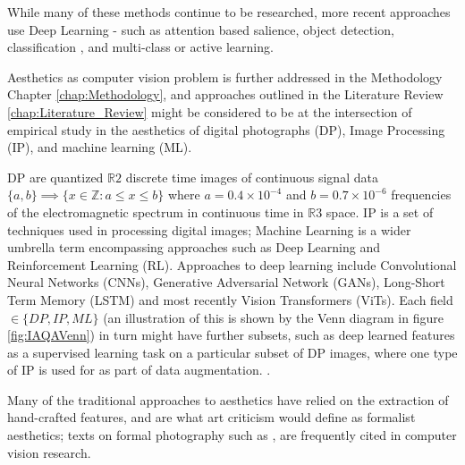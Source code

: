 \par While many of these methods continue to be researched, more recent approaches use Deep Learning - such as attention based salience\cite{Zhu2020}, object detection\cite {Mutch2006, Lei2019, Peng2018}, classification \cite{Jia2020}, and multi-class or active learning\cite{Wu2020a, Joshi2010, Li2004, Gu2015}.

Aesthetics as computer vision problem is further addressed in the Methodology Chapter \ref{chap:Methodology}, and approaches outlined in the Literature Review \ref{chap:Literature_Review} might be considered to be at the intersection of empirical study in the aesthetics of digital photographs (DP), Image Processing (IP), and machine learning (ML). 

\par DP are quantized $\mathbb{R}2$ discrete time images of continuous signal data $\{a,b\} \implies \{x\in \mathbb{Z} : a \leq x \leq b\}$ where $a = 0.4\times{10^{- 4}}$ and $ b = 0.7\times {10^{- 6}}$ frequencies of the electromagnetic spectrum in continuous time in $\mathbb{R}3$ space. IP is a set of techniques used in processing digital images; Machine Learning is a wider umbrella term encompassing approaches such as Deep Learning and Reinforcement Learning (RL). Approaches to deep learning include Convolutional Neural Networks (CNNs)\cite{LeCun1989}, Generative Adversarial Network (GANs)\cite{Goodfellow2020}, Long-Short Term Memory (LSTM)\cite{Hochreiter1997a} and most recently Vision Transformers (ViTs)\cite{Yuan2021, Dosovitskiy2020}. Each field $\in \{DP, IP, ML\} $ (an illustration of this is shown by the Venn diagram in figure \ref{fig:IAQAVenn}) in turn might have further subsets, such as deep learned features as a supervised learning task on a particular subset of DP images, where one type of IP is used for as part of data augmentation. \cite{morris2004computer}.

Many of the traditional approaches to aesthetics have relied on the extraction of hand-crafted features, and are what art criticism would define as formalist aesthetics; texts on formal  photography such as \cite{Kodak1995take}, are frequently cited in computer vision research\cite{Mitarai2013, Murray2012,Talebi2018}. 

